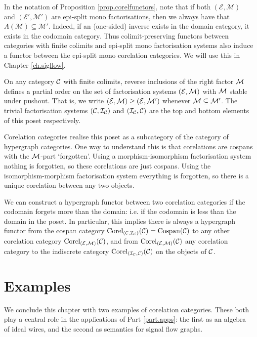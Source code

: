 \begin{example}
  In the notation of Proposition \ref{prop.corelfunctors}, note that if both
  $(\mathcal E, \mathcal M)$ and $(\mathcal E', \mathcal M')$ are epi-split mono
  factorisations, then we always have that $A(\mathcal M) \subseteq \mathcal
  M'$. Indeed, if an (one-sided) inverse exists in the domain category, it
  exists in the codomain category. Thus colimit-preserving functors between
  categories with finite colimits and epi-split mono factorisation systems also
  induce a functor between the epi-split mono corelation categories. We will use
  this in Chapter \ref{ch.sigflow}.
\end{example}

\begin{remark} \label{rem.corelposet}
  On any category $\mathcal C$ with finite colimits, reverse inclusions of the right factor
  $\mathcal M$ defines a partial order on the set of factorisation systems $(\mathcal E,\mathcal
  M)$ with $\mathcal M$ stable under pushout. That is, we write $(\mathcal E,\mathcal M) \ge (\mathcal
  E,\mathcal M')$ whenever $\mathcal M \subseteq \mathcal M'$.  The trivial factorisation
  systems $(\mathcal C,\mathcal I_{\mathcal C})$ and $(\mathcal I_{\mathcal C},\mathcal C)$ are the top and
  bottom elements of this poset respectively.

  Corelation categories realise this poset as a subcategory of the category of
  hypergraph categories. One way to understand this is that corelations are
  cospans with the $\mathcal M$-part `forgotten'. Using a morphism-isomorphism
  factorisation system nothing is forgotten, so these corelations are just
  cospans. Using the isomorphism-morphism factorisation system everything is
  forgotten, so there is a unique corelation between any two objects.

  We can construct a hypergraph functor between two corelation categories if the
  codomain forgets more than the domain: i.e. if the codomain is less than
  the domain in the poset. In particular, this implies there is always a
  hypergraph functor from the cospan category $\operatorname{{Corel}}_{(\mathcal C,\mathcal I_{\mathcal
  C})}(\mathcal C)= \operatorname{{Cospan}}(\mathcal C)$ to any other corelation category $\operatorname{{Corel}}_{(\mathcal
  E,\mathcal M)}(\mathcal C)$, and from $\operatorname{{Corel}}_{(\mathcal E,\mathcal M)}(\mathcal C)$ any corelation
  category to the indiscrete category $\operatorname{{Corel}}_{(\mathcal I_{\mathcal C},\mathcal C)}(\mathcal C)$ on
  the objects of $\mathcal C$.
\end{remark}

\section{Examples} \label{sec.corelexs}
We conclude this chapter with two examples of corelation categories. These both
play a central role in the applications of Part \ref{part.apps}: the first as
an algebra of ideal wires, and the second as semantics for signal flow graphs.


